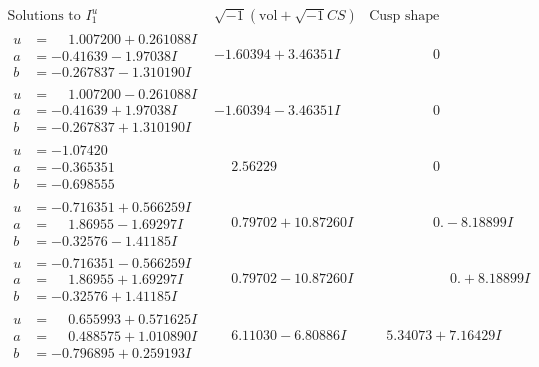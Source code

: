 \documentclass[1p]{elsarticle_modified}
\theoremstyle{definition}
\newcommand{\I}{\sqrt{-1}}
\begin{document}
$$\begin{array}{c|c|c}  
\text{Solutions to }I^u_{1}& \I (\text{vol} + \sqrt{-1}CS) & \text{Cusp shape}\\
 \hline 
\begin{aligned}
u &= \phantom{-}1.007200 + 0.261088 I \\
a &= -0.41639 - 1.97038 I \\
b &= -0.267837 - 1.310190 I\end{aligned}
 & -1.60394 + 3.46351 I & \phantom{-0.000000 } 0 \\ \hline\begin{aligned}
u &= \phantom{-}1.007200 - 0.261088 I \\
a &= -0.41639 + 1.97038 I \\
b &= -0.267837 + 1.310190 I\end{aligned}
 & -1.60394 - 3.46351 I & \phantom{-0.000000 } 0 \\ \hline\begin{aligned}
u &= -1.07420\phantom{ +0.000000I} \\
a &= -0.365351\phantom{ +0.000000I} \\
b &= -0.698555\phantom{ +0.000000I}\end{aligned}
 & \phantom{-}2.56229\phantom{ +0.000000I} & \phantom{-0.000000 } 0 \\ \hline\begin{aligned}
u &= -0.716351 + 0.566259 I \\
a &= \phantom{-}1.86955 - 1.69297 I \\
b &= -0.32576 - 1.41185 I\end{aligned}
 & \phantom{-}0.79702 + 10.87260 I & \phantom{-0.000000 } 0. - 8.18899 I \\ \hline\begin{aligned}
u &= -0.716351 - 0.566259 I \\
a &= \phantom{-}1.86955 + 1.69297 I \\
b &= -0.32576 + 1.41185 I\end{aligned}
 & \phantom{-}0.79702 - 10.87260 I & \phantom{-0.000000 -}0. + 8.18899 I \\ \hline\begin{aligned}
u &= \phantom{-}0.655993 + 0.571625 I \\
a &= \phantom{-}0.488575 + 1.010890 I \\
b &= -0.796895 + 0.259193 I\end{aligned}
 & \phantom{-}6.11030 - 6.80886 I & \phantom{-}5.34073 + 7.16429 I \\ \hline\begin{aligned}

\end{aligned}
\end{array}$$
\end{document}
